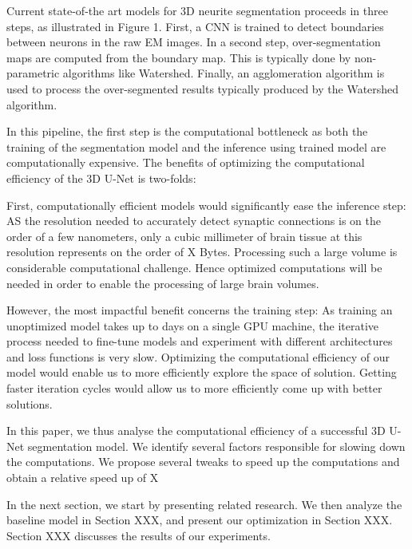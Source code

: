 \documentclass[runningheads]{llncs}
\begin{document}
Current state-of-the art models for 3D neurite segmentation proceeds in three steps, as illustrated in Figure 1. First, a CNN is trained to detect boundaries between neurons in the raw EM images. In a second step, over-segmentation maps are computed from the boundary map. This is typically done by non-parametric algorithms like Watershed. Finally, an agglomeration algorithm is used to process the over-segmented results typically produced by the Watershed algorithm. 



In this pipeline, the first step is the computational bottleneck as both the training of the segmentation model and the inference using trained model are computationally expensive. The benefits of optimizing the computational efficiency of the 3D U-Net is two-folds: 



First, computationally efficient models would significantly ease the inference step: AS the resolution needed to accurately detect synaptic connections is on the order of a few nanometers, only a cubic millimeter of brain tissue at this resolution represents on the order of X Bytes. Processing such a large volume is considerable computational challenge. Hence optimized computations will be needed in order to enable the processing of large brain volumes.



However, the most impactful benefit concerns the training step: As training an unoptimized model takes up to days on a single GPU machine, the iterative process needed to fine-tune models and experiment with different architectures and loss functions is very slow. Optimizing the computational efficiency of our model would enable us to more efficiently explore the space of solution. Getting faster iteration cycles would allow us to more efficiently come up with better solutions. 



In this paper, we thus analyse the computational efficiency of a successful 3D U-Net segmentation model. We identify several factors responsible for slowing down the computations. We propose several tweaks to speed up the computations and obtain a relative speed up of X%



In the next section, we start by presenting related research. We then analyze the baseline model in Section XXX, and present our optimization in Section XXX. Section XXX discusses the results of our experiments.
\end{document}
